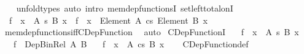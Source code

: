 \begin{isabellebody}
%
\isadelimproof
\ \ %
\endisadelimproof
%
\isatagproof
{}\isamarkupfalse%
\ unfold{\isacharunderscore}{\kern0pt}types\ {\isacharparenleft}{\kern0pt}auto\ intro{\isacharbang}{\kern0pt}{\isacharcolon}{\kern0pt}\ mem{\isacharunderscore}{\kern0pt}dep{\isacharunderscore}{\kern0pt}functionsI\ set{\isacharunderscore}{\kern0pt}left{\isacharunderscore}{\kern0pt}total{\isacharunderscore}{\kern0pt}onI{\isacharparenright}{\kern0pt}%
\endisatagproof
{\isafoldproof}%
%
\isadelimproof
\isanewline
%
\endisadelimproof
\isanewline
{}\isamarkupfalse%
\isanewline
\ \ {\isachardoublequoteopen}f\ {\isasymin}\ {\isacharparenleft}{\kern0pt}x\ {\isasymin}\ A{\isacharparenright}{\kern0pt}\ {\isasymrightarrow}s\ {\isacharparenleft}{\kern0pt}B\ x{\isacharparenright}{\kern0pt}{\isachardoublequoteclose}\ {\isasymrightleftharpoons}\ {\isachardoublequoteopen}f\ {\isacharcolon}{\kern0pt}\ {\isacharparenleft}{\kern0pt}x\ {\isacharcolon}{\kern0pt}\ Element\ A{\isacharparenright}{\kern0pt}\ {\isasymrightarrow}cs\ Element\ {\isacharparenleft}{\kern0pt}B\ x{\isacharparenright}{\kern0pt}{\isachardoublequoteclose}\isanewline
%
\isadelimproof
\ \ %
\endisadelimproof
%
\isatagproof
{}\isamarkupfalse%
\ mem{\isacharunderscore}{\kern0pt}dep{\isacharunderscore}{\kern0pt}functions{\isacharunderscore}{\kern0pt}iff{\isacharunderscore}{\kern0pt}CDep{\isacharunderscore}{\kern0pt}Function\ \isamarkupfalse%
\ auto%
\endisatagproof
{\isafoldproof}%
%
\isadelimproof
\isanewline
%
\endisadelimproof
\isanewline
{}\isamarkupfalse%
\ CDep{\isacharunderscore}{\kern0pt}FunctionI{\isacharcolon}{\kern0pt}\isanewline
\ \ \ {\isachardoublequoteopen}f\ {\isacharcolon}{\kern0pt}\ {\isacharparenleft}{\kern0pt}x\ {\isacharcolon}{\kern0pt}\ A{\isacharparenright}{\kern0pt}\ {\isasymrightarrow}s\ B\ x{\isachardoublequoteclose}\isanewline
\ \ \ {\isachardoublequoteopen}f\ {\isacharcolon}{\kern0pt}\ Dep{\isacharunderscore}{\kern0pt}Bin{\isacharunderscore}{\kern0pt}Rel\ A\ B{\isachardoublequoteclose}\isanewline
\ \ \ {\isachardoublequoteopen}f\ {\isacharcolon}{\kern0pt}\ {\isacharparenleft}{\kern0pt}x\ {\isacharcolon}{\kern0pt}\ A{\isacharparenright}{\kern0pt}\ {\isasymrightarrow}cs\ B\ x{\isachardoublequoteclose}\isanewline
%
\isadelimproof
\ \ %
\endisadelimproof
%
\isatagproof
{}\isamarkupfalse%
\ CDep{\isacharunderscore}{\kern0pt}Function{\isacharunderscore}{\kern0pt}def\ \isamarkupfalse%

\end{isabellebody}
